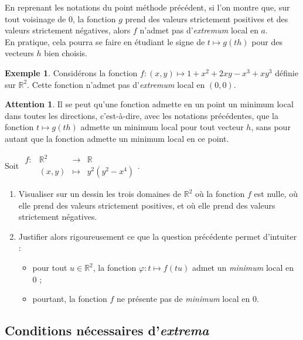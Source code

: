 \documentclass[french]{article}
\newcommand{\R}{\mathbb{R}}
\theoremstyle{plain}
\theoremstyle{definition}
\newtheorem*{ex}{Exemple}
\newtheorem*{attention}{Attention}
\theoremstyle{remark}
\begin{document}
\begin{met}
	En reprenant les notations du point méthode précédent, si l'on montre que, sur tout voisinage de $0$, la fonction $g$ prend des valeurs strictement positives et des valeurs strictement négatives, alors $f$ n'admet pas d'\textit{extremum} local en $a$.\\
	En pratique, cela pourra se faire en étudiant le signe de $t\mapsto g(th)$ pour des vecteurs $h$ bien choisis.
\end{met}

\begin{ex}
	Considérons la fonction $f:(x,y)\mapsto 1+x^2+2xy-x^3+xy^3$ définie sur $\R^2$. Cette fonction n'admet pas d'\textit{extremum} local en $(0,0)$.
\end{ex}

\begin{attention}
	Il se peut qu'une fonction admette en un point un minimum local dans toutes les directions, c'est-à-dire, avec les notations précédentes, que la fonction $t\mapsto g(th)$ admette un minimum local pour tout vecteur $h$, sans pour autant que la fonction admette un minimum local en ce point.
\end{attention}

\begin{exo}
	Soit $\begin{array}{lrcl}
		f:&\R^2&\longrightarrow&\R\\
		&(x,y)&\longmapsto&y^2(y^2-x^4)
	\end{array}$.
	\begin{enumerate}
		\item Visualiser sur un dessin les trois domaines de $\R^2$ où la fonction $f$ est nulle, où elle prend des valeurs strictement positives, et où elle prend des valeurs strictement négatives.
		\item Justifier alors rigoureusement ce que la question précédente permet d'intuiter :
		\begin{itemize}
			\item pour tout $u\in\R^2$, la fonction $\varphi:t\mapsto f(tu)$ admet un \textit{minimum} local en $0$ ;
			\item pourtant, la fonction $f$ ne présente pas de \textit{minimum} local en $0$.
		\end{itemize}
	\end{enumerate}
\end{exo}

\subsection{Conditions nécessaires d'\textit{extrema}}
\end{document}
